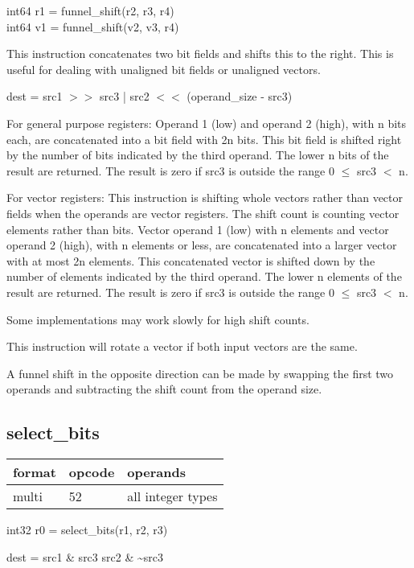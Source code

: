 \documentclass[forwardcom.tex]{subfiles}
\begin{document}
int64 r1 = funnel\_shift(r2, r3, r4) \\
int64 v1 = funnel\_shift(v2, v3, r4) \\
\vv

This instruction concatenates two bit fields and shifts this to the right. This is useful for dealing with unaligned bit fields or unaligned vectors.
\vv

dest = src1 $>>$ src3 | src2 $<<$ (operand\_size - src3)
\vv

For general purpose registers: Operand 1 (low) and operand 2 (high), with n bits each, are concatenated into a bit field with 2n bits. This bit field is shifted right by the number of bits indicated by the third operand. The lower n bits of the result are returned. The result is zero if src3 is outside the range 0 $\leq$ src3 $<$ n.
\vv

For vector registers: This instruction is shifting whole vectors rather than vector fields when the operands are vector registers. The shift count is counting vector elements rather than bits. 
Vector operand 1 (low) with n elements and vector operand 2 (high), with n elements or less, are concatenated into a larger vector with at most 2n elements. This concatenated vector is shifted down by the number of elements indicated by the third operand. The lower n elements of the result are returned. The result is zero if src3 is outside the range 0 $\leq$ src3 $<$ n.
\vv

Some implementations may work slowly for high shift counts. 
\vv

This instruction will rotate a vector if both input vectors are the same.
\vv

A funnel shift in the opposite direction can be made by swapping the first two operands and subtracting the shift count from the operand size.
\vv


\subsection{select\_bits}
\label{table:selectBitsInstruction}
\begin{tabular}{|p{12mm}|p{15mm}|p{100mm}|}
\hline
\bfseries format & \bfseries opcode & \bfseries operands \\ \hline
multi & 52 & all integer types \\ \hline
\end{tabular}
\vv

int32 r0 = select\_bits(r1, r2, r3)
\vv

dest = src1 \& src3 \textbar{} src2 \& \~{}src3
\vv
\end{document}
